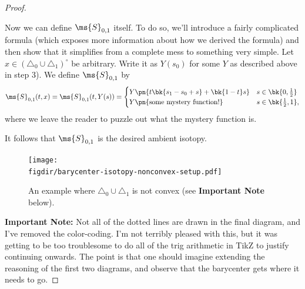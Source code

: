 \begin{proof}
\begin{enumerate}[label=\arabic*)]
      Now we can define $\ms{S}_{0,1}$ itself. To do so, we'll
      introduce a fairly complicated formula (which exposes more
      information about how we derived the formula) and then show
      that it simplifies from a complete mess to something very
      simple. Let $x \in (\triangle_0 \cup \triangle_1)^\circ$ be
      arbitrary. Write it as $Y(s_0)$ for some $Y$ as described
      above in step 3). We define $\ms{S}_{0,1}$ by
      \[
      \ms{S}_{0,1}(t, x) = \ms{S}_{0,1}(t, Y(s)) =
      \begin{cases}
        Y\pn{t\bk{s_1 - s_0 + s} + \bk{1-t}s} & s \in \bk{0,
          \frac{1}{2}} \\
        Y\pn{ \text{some mystery function!}
        } & s \in \bk{\frac{1}{2}, 1},
      \end{cases}
      \]
      where we leave the reader to puzzle out what the mystery
      function is.
  \end{enumerate}
  It follows that $\ms{S}_{0,1}$ is the desired ambient isotopy.
  \begin{figure}[H]
    \centering
    \texttt{[image: \\figdir/barycenter-isotopy-nonconvex-setup.pdf]}
    \caption{An example where $\triangle_0 \cup \triangle_1$ is not
      convex (see \textbf{Important Note} below).}
    \label{fig:barycenter-isotopy-nonconvex}
  \end{figure}
  \textbf{Important Note:} Not all of the dotted lines are drawn in
  the final diagram, and I've removed the color-coding. I'm not
  terribly pleased with this, but it was getting to be too
  troublesome to do all of the trig arithmetic in TikZ to justify
  continuing onwards. The point is that one should imagine extending
  the reasoning of the first two diagrams, and observe that the
  barycenter gets where it needs to go.
\end{proof}

